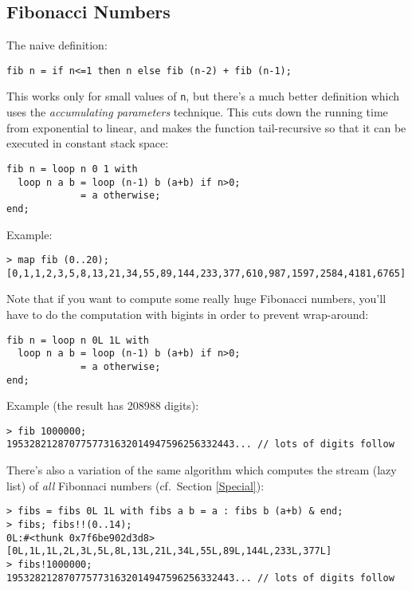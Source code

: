 \documentclass[a4paper,12pt]{article}
\begin{document}
\subsection{Fibonacci Numbers}
\label{Fibonacci}

The naive definition:

\begin{lstlisting}
fib n = if n<=1 then n else fib (n-2) + fib (n-1);
\end{lstlisting}

This works only for small values of \verb|n|, but there's a much better
definition which uses the \emph{accumulating parameters} technique. This cuts
down the running time from exponential to linear, and makes the function
tail-recursive so that it can be executed in constant stack space:

\begin{lstlisting}
fib n = loop n 0 1 with
  loop n a b = loop (n-1) b (a+b) if n>0;
             = a otherwise;
end;
\end{lstlisting}

\noindent Example:

\begin{lstlisting}
> map fib (0..20);
[0,1,1,2,3,5,8,13,21,34,55,89,144,233,377,610,987,1597,2584,4181,6765]
\end{lstlisting}

Note that if you want to compute some really huge Fibonacci numbers, you'll
have to do the computation with bigints in order to prevent wrap-around:

\begin{lstlisting}
fib n = loop n 0L 1L with
  loop n a b = loop (n-1) b (a+b) if n>0;
             = a otherwise;
end;
\end{lstlisting}

\noindent Example (the result has 208988 digits):

\begin{lstlisting}
> fib 1000000;
1953282128707757731632014947596256332443... // lots of digits follow
\end{lstlisting}

There's also a variation of the same algorithm which computes the stream (lazy list) of \emph{all} Fibonnaci numbers (cf.\ Section \ref{Special}):

\begin{lstlisting}
> fibs = fibs 0L 1L with fibs a b = a : fibs b (a+b) & end;
> fibs; fibs!!(0..14);
0L:#<thunk 0x7f6be902d3d8>
[0L,1L,1L,2L,3L,5L,8L,13L,21L,34L,55L,89L,144L,233L,377L]
> fibs!1000000;
1953282128707757731632014947596256332443... // lots of digits follow
\end{lstlisting}
\end{document}

